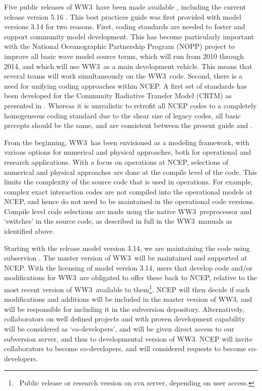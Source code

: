 \documentclass[12pt]{article}
\newcommand{\ws}{WW3}
\begin{document}
Five public releases of \ws\ have been made available \citep{tol:OMB99a,
tol:OMB02c, tol:MMAB09a, tol:MMAB14a}, including the current release version 5.16 . This best practices guide was first
provided with model versions 3.14 for two reasons. First, coding standards are
needed to foster and support community model development. This has become
particularly important with the National Oceanographic Partnership Program
(NOPP) project to improve all basic wave model source terms, which will run
from 2010 through 2014, and which will use \ws\ as a main development
vehicle. This means that several teams will work simultaneously on the \ws\
code. Second, there is a need for unifying coding approaches within NCEP. A
first set of standards has been developed for the Community Radiative Transfer
Model (CRTM) as presented in \cite{rep:PvD08}. Whereas it is unrealistic to
retrofit all NCEP codes to a completely homogeneous coding standard due to the
shear size of legacy codes, all basic precepts should be the same, and are
consistent between the present guide and \cite{rep:PvD08}.

From the beginning, \ws\ has been envisioned as a modeling framework, with
various options for numerical and physical approaches, both for operational
and research applications. With a focus on operations at NCEP, selections of
numerical and physical approaches are done at the compile level of the
code. This limits the complexity of the source code that is used in
operations. For example, complex exact interaction codes are not compiled into
the operational models at NCEP, and hence do not need to be maintained in the
operational code versions. Compile level code selections are made using the
native \ws\ preprocessor and `switches' in the source code, as described in
full in the \ws\ manuals as identified above.

Starting with the release model version 3.14, we are maintaining the code
using subservion \citep{bk:CSea06}. The master version of \ws\ will be
maintained and supported at NCEP. With the licensing of model version 3.14,
users that develop code and/or modifications for \ws\ are obligated to offer
these back to NCEP, relative to the most recent version of \ws\ available to
them\footnote{~Public release or research version on svn server, depending on
user access.}. NCEP will then decide if such modifications and additions will
be included in the master version of \ws, and will be responsible for
including it in the subversion depository. Alternatively, collaborators on
well defined projects and with proven development capability will be
considered as `co-developers', and will be given direct access to our
subversion server, and thus to developmental version of \ws. NCEP will invite
collaborators to become co-developers, and will considered requests to become
co-developers.
\end{document}
